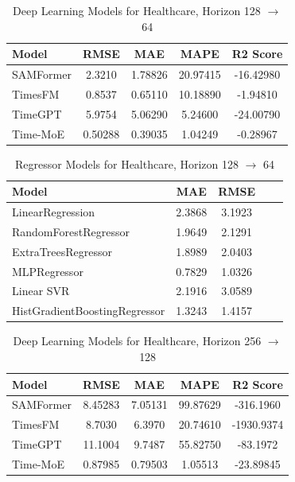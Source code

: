 \begin{table}[h!]
\centering
\begin{tabular}{lcccc}
\hline
Model & RMSE & MAE & MAPE & R2 Score \\
\hline
SAMFormer & 2.3210 & 1.78826 & 20.97415 & -16.42980 \\
TimesFM   & 0.8537 & 0.65110 & 10.18890 & -1.94810 \\
TimeGPT   & 5.9754 & 5.06290 & 5.24600  & -24.00790 \\
Time-MoE  & 0.50288& 0.39035 & 1.04249  & -0.28967 \\
\hline
\end{tabular}
\caption{Deep Learning Models for Healthcare, Horizon 128 \texorpdfstring{$\to$}{->} 64}
\label{tab:healthcare_128to64_dl}
\end{table}

\begin{table}[h!]
\centering
\begin{tabular}{lcccc}
\hline
Model & MAE & RMSE \\\hline
LinearRegression              & 2.3868 & 3.1923 \\
RandomForestRegressor         & 1.9649 & 2.1291 \\
ExtraTreesRegressor           & 1.8989 & 2.0403 \\
MLPRegressor                  & 0.7829 & 1.0326 \\
Linear SVR                    & 2.1916 & 3.0589 \\
HistGradientBoostingRegressor & 1.3243 & 1.4157 \\
\hline
\end{tabular}
\caption{Regressor Models for Healthcare, Horizon 128 \texorpdfstring{$\to$}{->} 64}
\label{tab:healthcare_128to64_reg}
\end{table}

\begin{table}[h!]
\centering
\begin{tabular}{lcccc}
\hline
Model & RMSE & MAE & MAPE & R2 Score \\
\hline
SAMFormer & 8.45283 & 7.05131 & 99.87629 & -316.1960 \\
TimesFM   & 8.7030  & 6.3970  & 20.74610 & -1930.9374 \\
TimeGPT   & 11.1004 & 9.7487  & 55.82750 & -83.1972 \\
Time-MoE  & 0.87985 & 0.79503 & 1.05513  & -23.89845 \\
\hline
\end{tabular}
\caption{Deep Learning Models for Healthcare, Horizon 256 \texorpdfstring{$\to$}{->} 128}
\label{tab:healthcare_256to128_dl}
\end{table}

